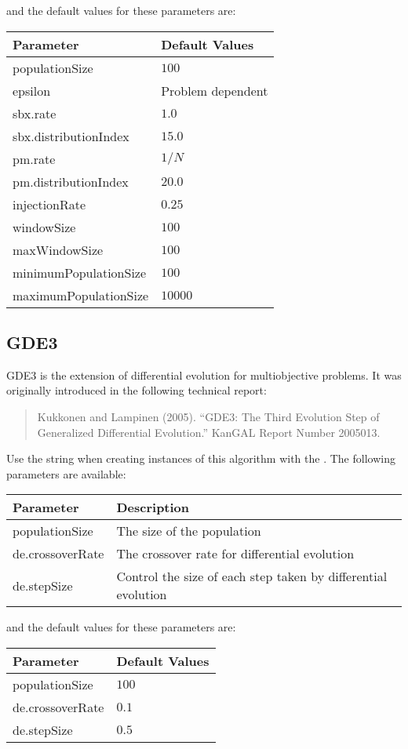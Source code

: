 \newline
\newline
and the default values for these parameters are:
\newline
\newline
\begin{tabularx}{\linewidth}{lX}
  \hline
  Parameter & Default Values \\
  \hline
  populationSize & $100$ \\
  epsilon & Problem dependent \\
  sbx.rate & $1.0$ \\
  sbx.distributionIndex & $15.0$ \\
  pm.rate & $1/N$ \\
  pm.distributionIndex & $20.0$ \\
  injectionRate & $0.25$ \\
  windowSize & $100$ \\
  maxWindowSize & $100$ \\
  minimumPopulationSize & $100$ \\
  maximumPopulationSize & $10000$ \\
  \hline
\end{tabularx}

\subsection{GDE3}
GDE3 is the extension of differential evolution for multiobjective problems.  It was originally introduced in the following technical report:
\begin{quote}
Kukkonen and Lampinen (2005). ``GDE3: The Third Evolution Step of Generalized Differential Evolution.'' KanGAL Report Number 2005013. 
\end{quote}
Use the string  when creating instances of this algorithm with the .  The following parameters are available:
\newline
\newline
\begin{tabularx}{\linewidth}{lX}
  \hline
  Parameter & Description \\
  \hline
  populationSize & The size of the population \\
  de.crossoverRate & The crossover rate for differential evolution \\
  de.stepSize & Control the size of each step taken by differential evolution \\
  \hline
\end{tabularx}
\newline
\newline
and the default values for these parameters are:
\newline
\newline
\begin{tabularx}{\linewidth}{lX}
  \hline
  Parameter & Default Values \\
  \hline
  populationSize & $100$ \\
  de.crossoverRate & $0.1$ \\
  de.stepSize & $0.5$ \\
  \hline
\end{tabularx}

